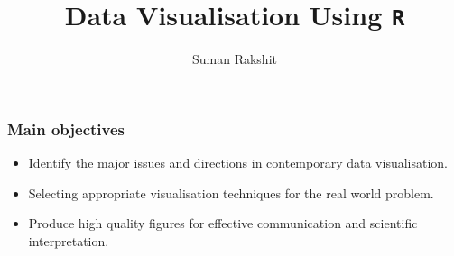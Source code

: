 \documentclass{beamer}
\title[]{Data Visualisation Using \texttt{R}}
\author[]{Suman Rakshit} %
\institute[Scool of EECMS, Curtin University] %
{
	\textcolor{magenta}{Scool of EECMS, Curtin University} %
}
\begin{document}
\begin{frame}
	\titlepage %
\end{frame}







\begin{frame}[t]\frametitle{Main objectives}\vspace{5pt}
\begin{itemize}
\item Identify the major issues and directions in contemporary data visualisation.
\vspace{0.5in}
\item<2-> Selecting appropriate visualisation techniques for the real world problem.
\vspace{0.5in}
\item<3-> Produce high quality figures for effective communication and scientific interpretation.
\end{itemize}
\end{frame}

%
%
%
\end{document}
